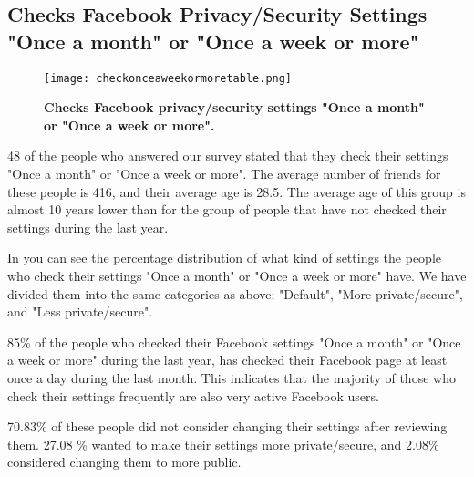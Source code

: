 \subsection{Checks Facebook Privacy/Security Settings "Once a month" or "Once a week or more"}

\begin{figure}[h!]
\centering
\texttt{[image: checkonceaweekormoretable.png]}
\caption[Checks Facebook privacy/security settings "Once a month" or "Once a week or more"]{\textbf{Checks Facebook privacy/security settings "Once a month" or "Once a week or more".}} 
\label{fig:onceaweekormore}
\end{figure}

48 of the people who answered our survey stated that they check their settings "Once a month" or "Once a week or more". The average number of friends for these people is 416, and their average age is 28.5. The average age of this group is almost 10 years lower than for the group of people that have not checked their settings during the last year.

In  you can see the percentage distribution of what kind of settings the people who check their settings "Once a month" or "Once a week or more" have. We have divided them into the same categories as above; "Default", "More private/secure", and "Less private/secure".  

85\% of the people who checked their Facebook settings "Once a month" or "Once a week or more" during the last year, has checked their Facebook page at least once a day during the last month. This indicates that the majority of those who check their settings frequently are also very active Facebook users. 

70.83\% of these people did not consider changing their settings after reviewing them. 27.08 \% wanted to make their settings more private/secure, and 2.08\% considered changing them to more public. 





